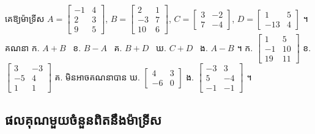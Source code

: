 \begin{pro}
គេឱ្យម៉ាទ្រីស $A = \begin{bmatrix} -1 & 4\\ 2 & 3\\ 9 & 5 \end{bmatrix}$, $B = \begin{bmatrix} 2 & 1\\ -3 & 7\\ 10 & 6 \end{bmatrix}$, $C = \begin{bmatrix} 3 & -2\\ 7 & -4 \end{bmatrix}$, $D = \begin{bmatrix} 1 & 5\\ -13 & 4 \end{bmatrix}$ ។ គណនា ក. $A + B$ \ ខ. $B - A$ \ គ. $B + D$ \ ឃ. $C + D$ \ ង. $A - B$ ។
\ans
ក. $\begin{bmatrix} 1 & 5\\ -1 & 10\\ 19 & 11 \end{bmatrix}$ \quad ខ. $\begin{bmatrix} 3 & -3\\ -5 & 4\\ 1 & 1 \end{bmatrix}$ \quad គ. មិនអាចគណនាបាន \quad ឃ. $\begin{bmatrix} 4 & 3\\ -6 & 0 \end{bmatrix}$ \quad ង. $\begin{bmatrix} -3 & 3\\ 5 & -4\\ -1 & -1 \end{bmatrix}$ ។
\end{pro}

\subsection{ផលគុណមួយចំនួនពិតនឹងម៉ាទ្រីស}

